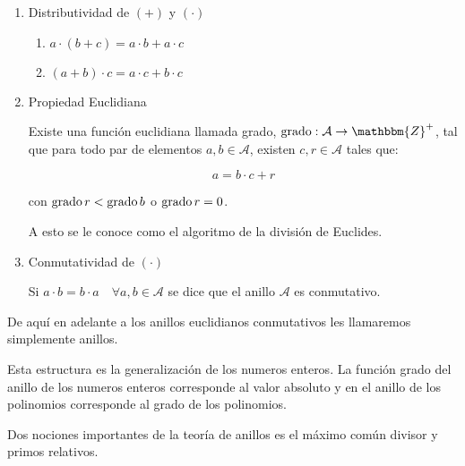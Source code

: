 \begin{enumerate}
            \item Distributividad de $(+)$ y $(\cdot)$

            \begin{enumerate}
                \item $a \cdot (b + c) = a \cdot b + a \cdot c$
                \item $(a + b) \cdot c = a \cdot c + b \cdot c$
            \end{enumerate}

            \item Propiedad Euclidiana

            Existe una función euclidiana llamada grado, $\grado : \mathcal{A} \to \mathbbm{Z}^+$, tal que para todo par de elementos $a, b \in \mathcal{A}$, existen $c, r \in \mathcal{A}$ tales que:

            \begin{equation*}
                a = b \cdot c + r
            \end{equation*}

            con $\operatorname{grado}{r} < \operatorname{grado}{b}$ o $\operatorname{grado}{r} = 0$.

            A esto se le conoce como el algoritmo de la división de Euclides.
            \item Conmutatividad de $(\cdot)$

            Si $a \cdot b = b \cdot a \quad \forall a, b \in \mathcal{A}$ se dice que el anillo $\mathcal{A}$ es conmutativo.
        \end{enumerate}

        De aquí en adelante a los anillos euclidianos conmutativos les llamaremos simplemente anillos.

        Esta estructura es la generalización de los numeros enteros. La función grado del anillo de los numeros enteros corresponde al valor absoluto y en el anillo de los polinomios corresponde al grado de los polinomios.

        Dos nociones importantes de la teoría de anillos es el máximo común divisor y primos relativos.
